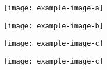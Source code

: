 \vspace{2em}

\begin{center} %
	\begin{minipage}[c]{.25\linewidth}
		\centering\texttt{[image: example-image-a]} 
	\end{minipage}\hfill
	\begin{minipage}[c]{.25\linewidth}
		\centering\texttt{[image: example-image-b]}
	\end{minipage}\hfill
	\begin{minipage}[c]{.25\linewidth}
		\centering\texttt{[image: example-image-c]} 
	\end{minipage}\hfill
	\begin{minipage}[c]{.25\linewidth}
		\centering\texttt{[image: example-image-c]}
	\end{minipage}\hfill
\end{center}

\restoregeometry